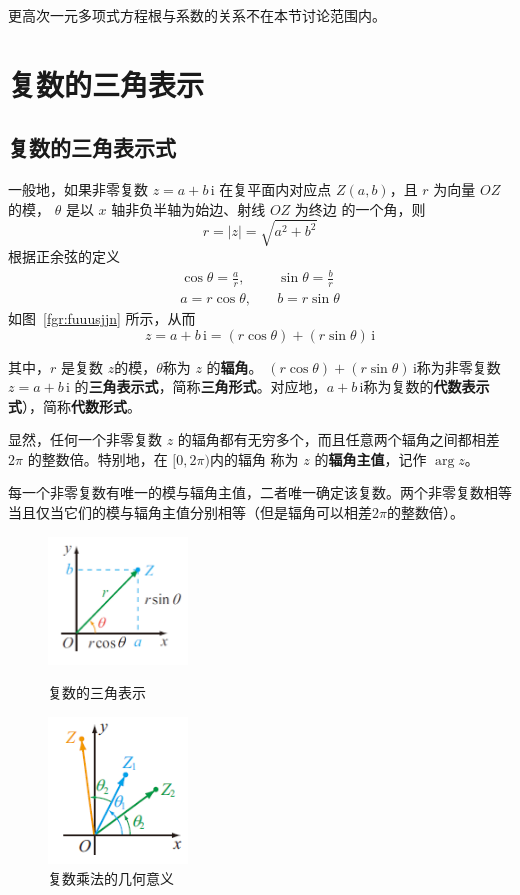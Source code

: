 \documentclass[a4paper,openany]{ctexbook}
\begin{document}
更高次一元多项式方程根与系数的关系不在本节讨论范围内。

\section{复数的三角表示}

\subsection{复数的三角表示式}

一般地，如果非零复数 \(z=a+b\,\mathrm{i}\) 在复平面内对应点 \(Z(a,b)\)，且 \(r\) 为向量 \(OZ\) 的模， \(\theta\) 是以 \(x\) 轴非负半轴为始边、射线 \(OZ\) 为终边
的一个角，则
\[
    r=|z|=\sqrt{a^2+b^2}
\]
根据正余弦的定义
\begin{align*}
    \cos \theta=\frac{a}{r},\quad & \sin \theta=\frac{b}{r} \\
    a=r \cos \theta,        \quad & b=r \sin \theta
\end{align*}
如图~\ref{fgr:fuuusjjn} 所示，从而
\[z=a+b\,\mathrm{i}=(r \cos \theta)+(r \sin \theta)\,\mathrm{i}\]

其中，\(r\) 是复数 \(z\)的模，\(\theta\)称为 \(z\) 的\textbf{辐角}。
\((r \cos \theta)+(r \sin \theta)\,\mathrm{i}\)称为非零复数 \(z=a+b\,\mathrm{i}\) 的\textbf{三角表示式}，简称\textbf{三角形式}。对应地，\(a+b\,\mathrm{i}\)称为复数的\textbf{代数表示式}），简称\textbf{代数形式}。

显然，任何一个非零复数 \(z\) 的辐角都有无穷多个，而且任意两个辐角之间都相差 \(2\pi\) 的整数倍。特别地，在 \([0,2 \pi )\)内的辐角
称为 \(z\) 的\textbf{辐角主值}，记作 \(\arg z\)。

每一个非零复数有唯一的模与辐角主值，二者唯一确定该复数。两个非零复数相等当且仅当它们的模与辐角主值分别相等（但是辐角可以相差\(2 \pi \)的整数倍）。

\begin{figure}
    \centering
    \begin{minipage}{13em}
        \centering
        \includegraphics[width=10em]{image7.png}
        \caption{复数的三角表示}\label{fgr:fuuusjjn}
    \end{minipage}
    \qquad
    \begin{minipage}{13em}
        \centering
        \includegraphics[width=10em]{image8.png}
        \caption{复数乘法的几何意义}\label{fgr:fuuusjjnigfa}
    \end{minipage}
\end{figure}
\end{document}
